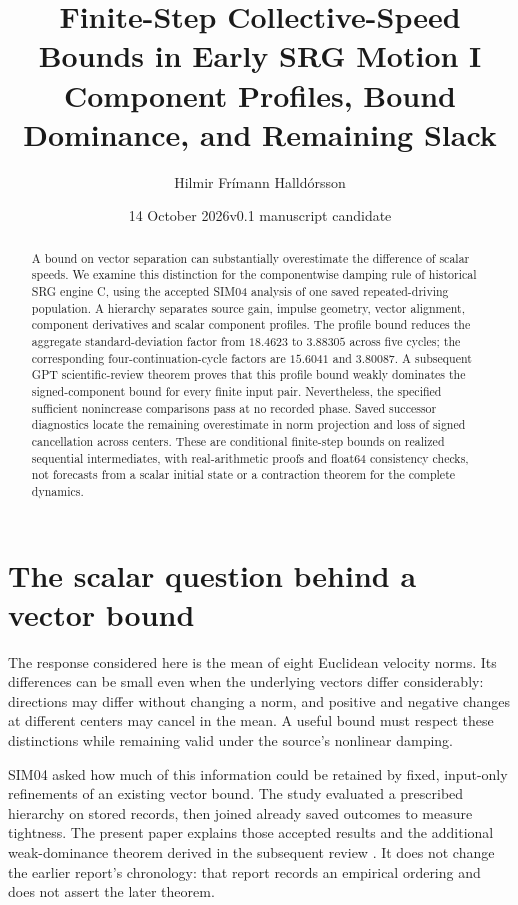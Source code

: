 \documentclass[11pt,a4paper]{article}
\title{\LARGE\bfseries Finite-Step Collective-Speed Bounds in Early SRG Motion I\\[7pt]\large Component Profiles, Bound Dominance, and Remaining Slack}
\author{Hilmir Frímann Halldórsson}
\date{14 October 2026\quad\textbar\quad v0.1 manuscript candidate}
\begin{document}
\maketitle
\begin{abstract}
A bound on vector separation can substantially overestimate the difference of scalar speeds. We examine this distinction for the componentwise damping rule of historical SRG engine C, using the accepted SIM04 analysis of one saved repeated-driving population. A hierarchy separates source gain, impulse geometry, vector alignment, component derivatives and scalar component profiles. The profile bound reduces the aggregate standard-deviation factor from \ensuremath{18.4623} to \ensuremath{3.88305} across five cycles; the corresponding four-continuation-cycle factors are \ensuremath{15.6041} and \ensuremath{3.80087}. A subsequent GPT scientific-review theorem proves that this profile bound weakly dominates the signed-component bound for every finite input pair. Nevertheless, the specified sufficient nonincrease comparisons pass at no recorded phase. Saved successor diagnostics locate the remaining overestimate in norm projection and loss of signed cancellation across centers. These are conditional finite-step bounds on realized sequential intermediates, with real-arithmetic proofs and float64 consistency checks, not forecasts from a scalar initial state or a contraction theorem for the complete dynamics.
\end{abstract}

\section{The scalar question behind a vector bound}
The response considered here is the mean of eight Euclidean velocity norms. Its differences can be small even when the underlying vectors differ considerably: directions may differ without changing a norm, and positive and negative changes at different centers may cancel in the mean. A useful bound must respect these distinctions while remaining valid under the source's nonlinear damping.

SIM04 asked how much of this information could be retained by fixed, input-only refinements of an existing vector bound. The study evaluated a prescribed hierarchy on stored records, then joined already saved outcomes to measure tightness. The present paper explains those accepted results and the additional weak-dominance theorem derived in the subsequent review \cite{report,math,review,dominance}. It does not change the earlier report's chronology: that report records an empirical ordering and does not assert the later theorem.
\end{document}
